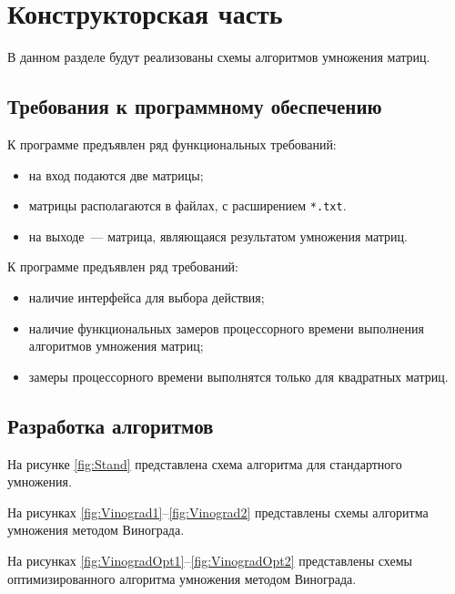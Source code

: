 \chapter{Конструкторская часть}
В данном разделе будут реализованы схемы алгоритмов умножения матриц.

\section{Требования к программному обеспечению}\label{section:requirements_1}
К программе предъявлен ряд функциональных требований:
\begin{itemize}
    \item на вход подаются две матрицы;
    \item матрицы располагаются в файлах, с расширением \texttt{*.txt}.
    \item на выходе~--- матрица, являющаяся результатом умножения матриц.
\end{itemize}

К программе предъявлен ряд требований:
\begin{itemize}
	\item наличие интерфейса для выбора действия;
	\item наличие функциональных замеров процессорного времени выполнения алгоритмов умножения матриц;
	\item замеры процессорного времени выполнятся только для квадратных матриц.
\end{itemize}

\section{Разработка алгоритмов}
На рисунке \ref{fig:Stand} представлена схема алгоритма для стандартного умножения.

На рисунках \ref{fig:Vinograd1}--\ref{fig:Vinograd2} представлены схемы алгоритма умножения методом Винограда.

На рисунках \ref{fig:VinogradOpt1}--\ref{fig:VinogradOpt2} представлены схемы оптимизированного алгоритма умножения методом Винограда.

